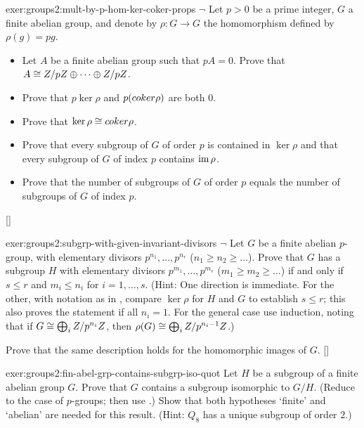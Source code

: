 \begin{exer}{}{exer:groups2:mult-by-p-hom-ker-coker-props}
  $\lnot$ Let $p > 0$ be a prime integer, $G$ a finite abelian group,
  and denote by $\rho : G \to G$ the homomorphism defined by
  $\rho(g) = pg$.
  \begin{itemize}
  \item Let $A$ be a finite abelian group such that $pA = 0$. Prove
    that $A \cong Z/pZ \oplus \dots \oplus Z/pZ$.
  \item Prove that $p\ker\rho$ and $p(coker\rho)$ are both $0$.
  \item Prove that $\ker\rho \cong coker\rho$.
  \item Prove that every subgroup of $G$ of order $p$ is contained in
    $\ker\rho$ and that every subgroup of $G$ of index $p$ contains
    $\operatorname{im}\rho$.
  \item Prove that the number of subgroups of $G$ of order $p$ equals
    the number of subgroups of $G$ of index $p$.
  \end{itemize}
  []
\end{exer}
\begin{exer}{}{exer:groups2:subgrp-with-given-invariant-divisors}
  $\lnot$ Let $G$ be a finite abelian $p$-group, with elementary
  divisors $p^{n_1}, \dots, p^{n_r}$ ($n_1 \geq n_2 \geq \dots$).
  Prove that $G$ has a subgroup $H$ with elementary divisors
  $p^{m_1}, \dots, p^{m_s}$ ($m_1 \geq m_2 \geq \dots$) if and only if
  $s \leq r$ and $m_i \leq n_i$ for $i = 1, \dots, s$. (Hint: One
  direction is immediate. For the other, with notation as in
  , compare
  $\ker\rho$ for $H$ and $G$ to establish $s \leq r$; this also proves
  the statement if all $n_i = 1$.  For the general case use induction,
  noting that if $G \cong \bigoplus_i Z/p^{n_i}Z$, then
  $\rho(G) \cong \bigoplus_i Z/p^{n_i - 1}Z$.)

  Prove that the same description holds for the homomorphic images of
  $G$. []
\end{exer}
\begin{exer}{}{exer:groups2:fin-abel-grp-contains-subgrp-iso-quot}
  Let $H$ be a subgroup of a finite abelian group $G$. Prove that $G$
  contains a subgroup isomorphic to $G/H$. (Reduce to the case of
  $p$-groups; then use
  .) Show that
  both hypotheses `finite' and `abelian' are needed for this
  result. (Hint: $Q_8$ has a unique subgroup of order $2$.)
\end{exer}
